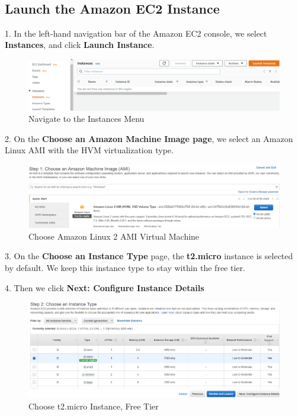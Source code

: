 \documentclass[12pt,a4paper,twoside]{article}
\begin{document}
~\newpage

\subsection{Launch the Amazon EC2 Instance}


1. In the left-hand navigation bar of the Amazon EC2 console, we select \textbf{Instances}, and click \textbf{Launch Instance}.


\begin{figure}[H]
    \centering
        \includegraphics[width=15cm]{images-aws/4-instances.png}
        \caption{Navigate to the Instances Menu}
\end{figure}


2. On the \textbf{Choose an Amazon Machine Image page}, we select an Amazon Linux AMI with the HVM virtualization type.


\begin{figure}[H]
    \centering
        \includegraphics[width=15cm]{images-aws/5-amazon-linux.png}
        \caption{Choose Amazon Linux 2 AMI Virtual Machine}
\end{figure}


3. On the \textbf{Choose an Instance Type} page, the \textbf{t2.micro} instance is selected by default. We keep this instance type to stay within the free tier.


4. Then we click \textbf{Next: Configure Instance Details}


\begin{figure}[H]
    \centering
        \includegraphics[width=15cm]{images-aws/6-instance-type.png}
        \caption{Choose t2.micro Instance, Free Tier}
\end{figure}
\end{document}
